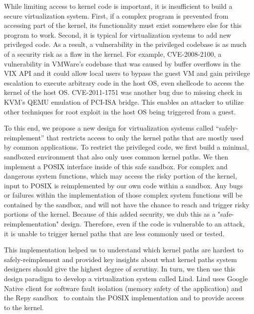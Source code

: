 While limiting access to kernel code is important, it is
insufficient to build a secure virtualization system.  First, if a complex
program is prevented from accessing part of the kernel, its functionality 
must exist somewhere else for this program to work.  Second, it is 
typical for virtualization systems to add new privileged code.
As a result, a vulnerability in the privileged codebase is as much of a security 
risk as a flaw in the kernel.  %
For example, CVE-2008-2100, a vulnerability in VMWare's codebase that was caused by buffer overflows 
in the VIX API and it could allow local users to bypass the guest VM and gain privilege escalation to execute arbitrary code in the host
OS, even shellcode to access the kernel of the host OS. CVE-2011-1751 was another bug due to missing check in KVM's QEMU emulation of PCI-ISA bridge. This enables an attacker to utilize other techniques \cite{Virtunoid} for root exploit in the host OS being triggered from a guest.  



To this end, we propose a new design for virtualization 
systems called ``safely-reimplement'' that restricts access to only the
kernel paths that are mostly used by common applications.  To restrict the privileged
code, we first build a minimal, sandboxed environment that also only uses 
common kernel paths.
We then implement a POSIX interface inside of this safe sandbox. For complex and dangerous system functions, which may access the risky portion of the kernel, 
input to POSIX is reimplemented by our own code within a sandbox. Any bugs or failures within the implementation of those complex system functions 
will be contained by the sandbox, and will not have the chance to reach 
and trigger risky portions of the kernel. Because of this added security, we dub this as a "safe-reimplementation" design.  Therefore, even if the code
is vulnerable to an attack, it is unable to trigger
kernel paths that are less commonly used or tested.

This implementation helped us to understand which kernel paths are hardest to
safely-reimplement and provided key insights about what kernel paths system
designers should give the highest degree of scrutiny. In turn, we then use this design paradigm to develop a virtualization system called
Lind.  Lind uses Google Native client for software fault isolation (memory
safety of the application) and the Repy sandbox~\cite{Repy-10} to contain the POSIX
implementation and to provide access to the kernel.   

